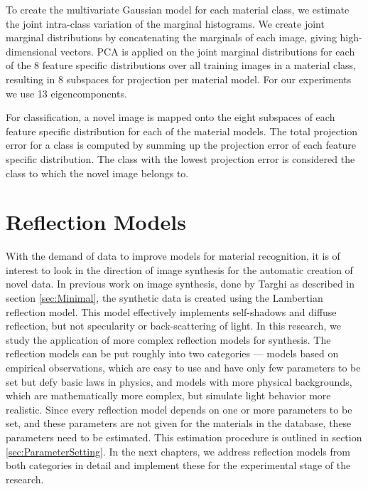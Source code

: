 To create the multivariate Gaussian model for each material class, we estimate the joint intra-class variation of the marginal histograms. We create joint marginal distributions by concatenating the marginals of each image, giving high-dimensional vectors. PCA is applied on the joint marginal distributions for each of the 8 feature specific distributions over all training images in a material class, resulting in 8 subspaces for projection per material model. For our experiments we use 13 eigencomponents.

For classification, a novel image is mapped onto the eight subspaces of each feature specific distribution for each of the material models. The total projection error for a class is computed by summing up the projection error of each feature specific distribution. The class with the lowest projection error is considered the class to which the novel image belongs to. 

\section{Reflection Models}\label{sec:ReflectionModels}
With the demand of data to improve models for material recognition, it is of interest to look in the direction of image synthesis for the automatic creation of novel data. In previous work on image synthesis, done by Targhi as described in section \ref{sec:Minimal}, the synthetic data is created using the Lambertian reflection model. This model effectively implements self-shadows and diffuse reflection, but not specularity or back-scattering of light. In this research, we study the application of more complex reflection models for synthesis. The reflection models can be put roughly into two categories --- models based on empirical observations, which are easy to use and have only few parameters to be set but defy basic laws in physics, and models with more physical backgrounds, which are mathematically more complex, but simulate light behavior more realistic. Since every reflection model depends on one or more parameters to be set, and these parameters are not given for the materials in the database, these parameters need to be estimated. This estimation procedure is outlined in section \ref{sec:ParameterSetting}. In the next chapters, we address reflection models from both categories in detail and implement these for the experimental stage of the research.



